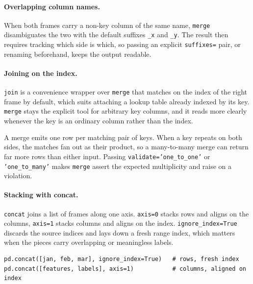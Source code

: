 \vspace{1ex}

\paragraph{Overlapping column names.} When both frames carry a non-key column of the same name, \texttt{merge} disambiguates the two with the default suffixes \texttt{\_x} and \texttt{\_y}. The result then requires tracking which side is which, so passing an explicit \texttt{suffixes=} pair, or renaming beforehand, keeps the output readable.

\paragraph{Joining on the index.} \texttt{join} is a convenience wrapper over \texttt{merge} that matches on the index of the right frame by default, which suits attaching a lookup table already indexed by its key. \texttt{merge} stays the explicit tool for arbitrary key columns, and it reads more clearly whenever the key is an ordinary column rather than the index.

\vspace{2ex}

\begin{keybox}
A merge emits one row per matching pair of keys. When a key repeats on both sides, the matches fan out as their product, so a many-to-many merge can return far more rows than either input. Passing \texttt{validate='one\_to\_one'} or \texttt{'one\_to\_many'} makes \texttt{merge} assert the expected multiplicity and raise on a violation.
\end{keybox}

\paragraph{Stacking with concat.} \texttt{concat} joins a list of frames along one axis. \texttt{axis=0} stacks rows and aligns on the columns, \texttt{axis=1} stacks columns and aligns on the index. \texttt{ignore\_index=True} discards the source indices and lays down a fresh range index, which matters when the pieces carry overlapping or meaningless labels.

\begin{lstlisting}[style=python, caption={Stack rows, then stack columns}]
pd.concat([jan, feb, mar], ignore_index=True)   # rows, fresh index
pd.concat([features, labels], axis=1)           # columns, aligned on index
\end{lstlisting}

